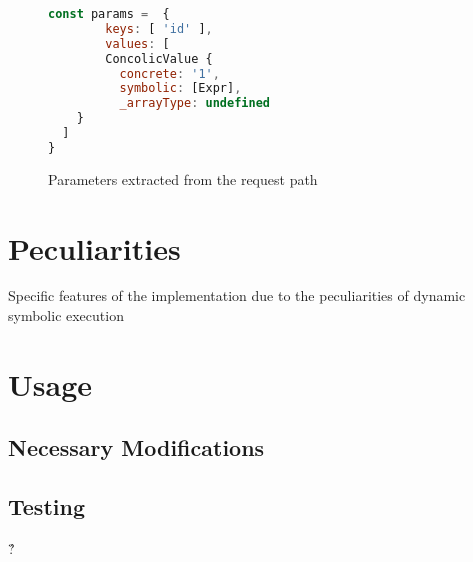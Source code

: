 \begin{figure}[ht]
    \begin{lstlisting}[language=JavaScript, gobble=4]
    const params =  {
        keys: [ 'id' ],
        values: [
        ConcolicValue {
          concrete: '1',
          symbolic: [Expr],
          _arrayType: undefined
    }
  ]
}
    \end{lstlisting}
    \caption{Parameters extracted from the request path}
    \label{fig:param-extracted}
\end{figure}




\section{Peculiarities}
Specific features of the implementation due to the peculiarities of dynamic symbolic execution

\section{Usage}
\subsection{Necessary Modifications}
\subsection{Testing}\'?